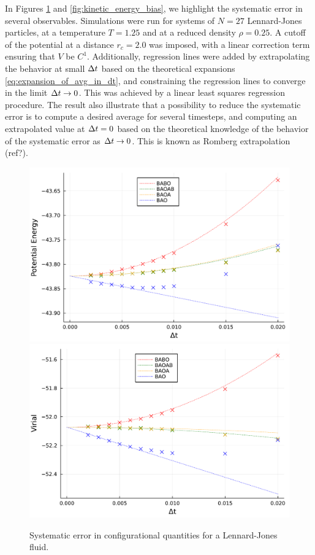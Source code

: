     In Figures \ref{fig:configurational_bias} and \ref{fig:kinetic_energy_bias}, we highlight the systematic error in several observables. Simulations were run for systems of $N=27$ Lennard-Jones particles, at a temperature $T=1.25$ and at a reduced density $\rho=0.25$. 
    A cutoff of the potential at a distance $r_c=2.0$ was imposed, with a linear correction term ensuring that $V$ be $C^1$. 
    Additionally, regression lines were added by extrapolating the behavior at small ${\Delta t}$ based on the theoretical expansions \eqref{eq:expansion_of_avg_in_dt}, and constraining the regression lines to converge in the limit ${\Delta t}\to 0$.
    This was achieved by a linear least squares regression procedure.
    The result also illustrate that a possibility to reduce the systematic error is to compute a desired average for several timesteps, and computing an extrapolated value at ${\Delta t}=0$ based on the theoretical knowledge of the behavior of the systematic error as ${\Delta t}\to 0$. This is known as Romberg extrapolation (ref?).
\begin{figure}[htbp]
    \begin{center}
      \includegraphics[width=0.7\linewidth]{figures/chapter1/potential_energy_bias.pdf}
      \includegraphics[width=0.7\linewidth]{figures/chapter1/virial_bias.pdf}
      \caption{ \label{fig:configurational_bias}
        Systematic error in configurational quantities for a Lennard-Jones fluid.
      }
    \end{center}
  \end{figure}

